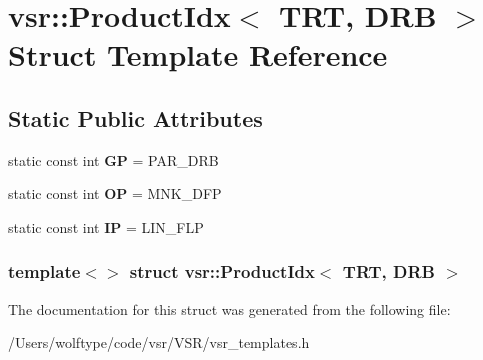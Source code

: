 \hypertarget{structvsr_1_1_product_idx_3_01_t_r_t_00_01_d_r_b_01_4}{\section{vsr\-:\-:Product\-Idx$<$ T\-R\-T, D\-R\-B $>$ Struct Template Reference}
\label{structvsr_1_1_product_idx_3_01_t_r_t_00_01_d_r_b_01_4}
}
\subsection*{Static Public Attributes}
\begin{DoxyCompactItemize}
\item 
\hypertarget{structvsr_1_1_product_idx_3_01_t_r_t_00_01_d_r_b_01_4_a9d94a0a5c487395cde0c8bcaaca3ef7f}{static const int {\bfseries G\-P} = P\-A\-R\-\_\-\-D\-R\-B}\label{structvsr_1_1_product_idx_3_01_t_r_t_00_01_d_r_b_01_4_a9d94a0a5c487395cde0c8bcaaca3ef7f}

\item 
\hypertarget{structvsr_1_1_product_idx_3_01_t_r_t_00_01_d_r_b_01_4_ae8161621a87c3d5ff5084d35c38d6169}{static const int {\bfseries O\-P} = M\-N\-K\-\_\-\-D\-F\-P}\label{structvsr_1_1_product_idx_3_01_t_r_t_00_01_d_r_b_01_4_ae8161621a87c3d5ff5084d35c38d6169}

\item 
\hypertarget{structvsr_1_1_product_idx_3_01_t_r_t_00_01_d_r_b_01_4_a842d2a5e160454d8aa1711f094a91e50}{static const int {\bfseries I\-P} = L\-I\-N\-\_\-\-F\-L\-P}\label{structvsr_1_1_product_idx_3_01_t_r_t_00_01_d_r_b_01_4_a842d2a5e160454d8aa1711f094a91e50}

\end{DoxyCompactItemize}
\subsubsection*{template$<$$>$ struct vsr\-::\-Product\-Idx$<$ T\-R\-T, D\-R\-B $>$}



The documentation for this struct was generated from the following file\-:\begin{DoxyCompactItemize}
\item 
/\-Users/wolftype/code/vsr/\-V\-S\-R/vsr\-\_\-templates.\-h\end{DoxyCompactItemize}
